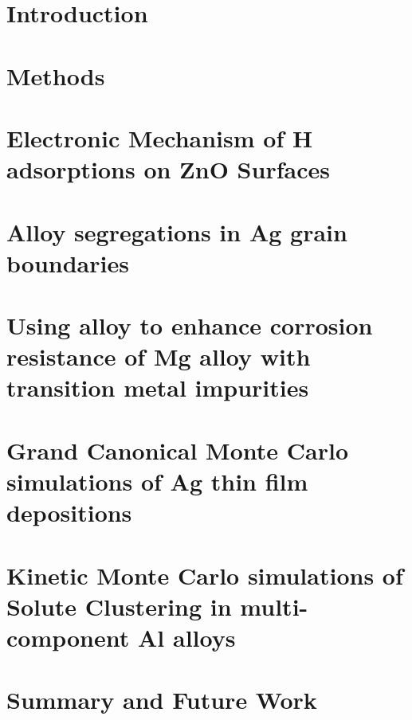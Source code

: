 \documentclass[reqno,12pt,oneside]{report} %
\theoremstyle{plain}
\theoremstyle{definition}
\theoremstyle{remark}
\numberwithin{theorem}{chapter}     %
\begin{document}
 \chapter{Introduction}
 \label{chap:Intro}
 

 \chapter{Methods}
 \label{chap:Methods}
 
 
 \chapter{Electronic Mechanism of H adsorptions on ZnO Surfaces}
 \label{chap:ZnO_H}
 
 
 \chapter{Alloy segregations in Ag grain boundaries}
 \label{chap:Ag_W}
 
 
 \chapter{Using alloy to enhance corrosion resistance of Mg alloy with transition metal impurities}
 \label{chap:Mg_H}
 
 
 \chapter{Grand Canonical Monte Carlo simulations of Ag thin film depositions}
 \label{chap:Ag/ZnO}
 
 
 \chapter{Kinetic Monte Carlo simulations of Solute Clustering in multi-component Al alloys}
 \label{chap:Al/Vac}
 
 
 \chapter{Summary and Future Work}
 \label{chap:Conc}
 
 
\startappendices
 \label{appd:passivation}
 
 
\startbibliography
 \begin{singlespace} %
 \end{singlespace}

%
\end{document}
